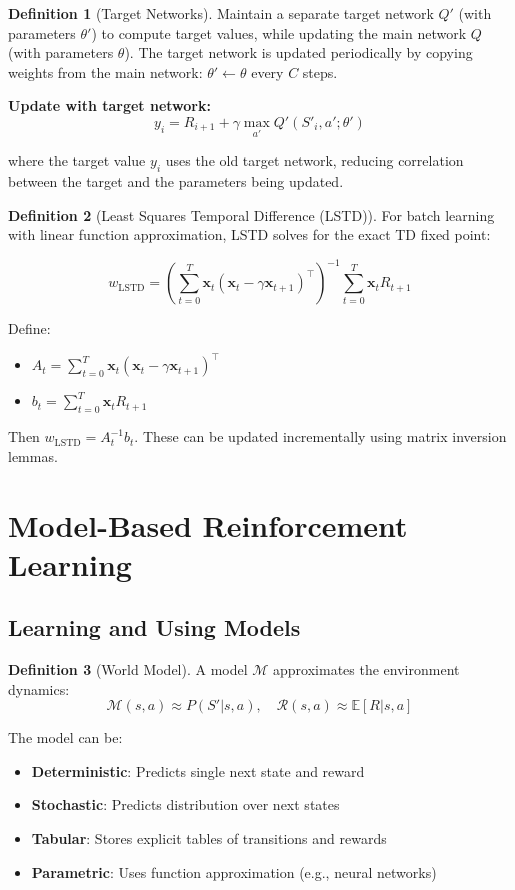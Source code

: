 \documentclass[12pt,a4paper]{article}
\theoremstyle{definition}
\newtheorem{definition}{Definition}[section]
\begin{document}
\begin{definition}[Target Networks]
Maintain a separate target network $Q'$ (with parameters $\theta'$) to compute target values, while updating the main network $Q$ (with parameters $\theta$). The target network is updated periodically by copying weights from the main network: $\theta' \leftarrow \theta$ every $C$ steps.

\textbf{Update with target network:}
\[
y_i = R_{i+1} + \gamma \max_{a'} Q'(S'_i, a'; \theta')
\]

where the target value $y_i$ uses the old target network, reducing correlation between the target and the parameters being updated.
\end{definition}

\begin{definition}[Least Squares Temporal Difference (LSTD)]
For batch learning with linear function approximation, LSTD solves for the exact TD fixed point:

\[
w_{\text{LSTD}} = \left( \sum_{t=0}^T \mathbf{x}_t(\mathbf{x}_t - \gamma \mathbf{x}_{t+1})^\top \right)^{-1} \sum_{t=0}^T \mathbf{x}_t R_{t+1}
\]

Define:
\begin{itemize}
    \item $A_t = \sum_{t=0}^T \mathbf{x}_t(\mathbf{x}_t - \gamma \mathbf{x}_{t+1})^\top$
    \item $b_t = \sum_{t=0}^T \mathbf{x}_t R_{t+1}$
\end{itemize}

Then $w_{\text{LSTD}} = A_t^{-1} b_t$. These can be updated incrementally using matrix inversion lemmas.
\end{definition}

\section{Model-Based Reinforcement Learning}

\subsection{Learning and Using Models}

\begin{definition}[World Model]
A model $\mathcal{M}$ approximates the environment dynamics:
\[
\mathcal{M}(s, a) \approx P(S' | s, a), \quad \mathcal{R}(s, a) \approx \mathbb{E}[R | s, a]
\]

The model can be:
\begin{itemize}
    \item \textbf{Deterministic}: Predicts single next state and reward
    \item \textbf{Stochastic}: Predicts distribution over next states
    \item \textbf{Tabular}: Stores explicit tables of transitions and rewards
    \item \textbf{Parametric}: Uses function approximation (e.g., neural networks)
\end{itemize}
\end{definition}
\end{document}
